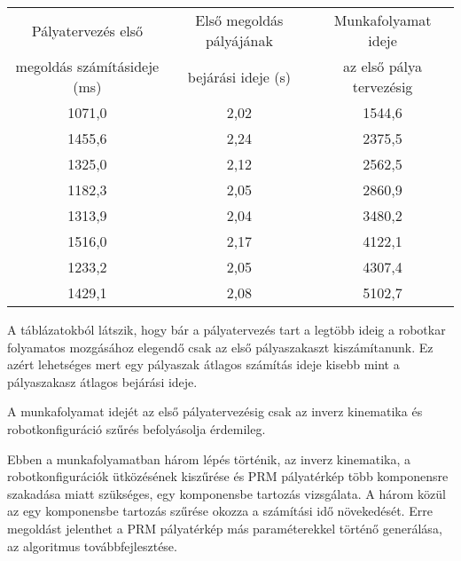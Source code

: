 \begin{center}
 \begin{tabular}{ |c|c||c| } 
 \hline
Pályatervezés első  & Első megoldás pályájának & Munkafolyamat ideje \\
megoldás számításideje (ms) & bejárási ideje (s)& az első pálya tervezésig\\
\hline

1071,0	& 2,02 &	1544,6\\
1455,6 & 2,24 & 2375,5\\
1325,0 & 2,12 & 2562,5\\
1182,3 & 2,05 & 2860,9\\
1313,9 & 2,04 & 3480,2\\
1516,0 & 2,17 & 4122,1\\
1233,2 & 2,05 & 4307,4\\
1429,1 & 2,08 & 5102,7\\

\hline
\end{tabular}
\end{center}

A táblázatokból látszik, hogy bár a pályatervezés tart a legtöbb ideig a robotkar folyamatos mozgásához elegendő csak az első pályaszakaszt kiszámítanunk. Ez azért lehetséges mert egy pályaszak átlagos számítás ideje kisebb mint a pályaszakasz átlagos bejárási ideje. 

A munkafolyamat idejét az első pályatervezésig csak az inverz kinematika és robotkonfiguráció szűrés befolyásolja érdemileg. 

Ebben a munkafolyamatban három lépés történik, az inverz kinematika, a robotkonfigurációk ütközésének kiszűrése és PRM pályatérkép több komponensre szakadása miatt szükséges, egy komponensbe tartozás vizsgálata. A három közül az egy komponensbe tartozás szűrése okozza a számítási idő növekedését. Erre megoldást jelenthet a PRM pályatérkép más paraméterekkel történő generálása, az algoritmus továbbfejlesztése.


